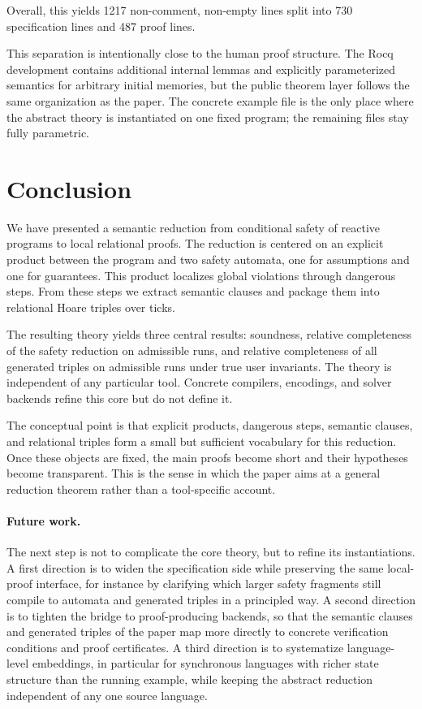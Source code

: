 \documentclass[acmsmall,screen]{acmart}
\theoremstyle{leftplain}
\theoremstyle{leftdefinition}
\theoremstyle{leftremark}
\begin{document}
Overall, this yields 1217 non-comment, non-empty lines split into 730
specification lines and 487 proof lines.

This separation is intentionally close to the human proof structure. The Rocq
development contains additional internal lemmas and explicitly parameterized
semantics for arbitrary initial memories, but the public theorem layer follows
the same organization as the paper. The concrete example file is the only place
where the abstract theory is instantiated on one fixed program; the remaining
files stay fully parametric.

\section{Conclusion}\label{sec:conclusion}
We have presented a semantic reduction from conditional safety of reactive
programs to local relational proofs. The reduction is centered on an explicit
product between the program and two safety automata, one for assumptions and
one for guarantees. This product localizes global violations through dangerous
steps. From these steps we extract semantic clauses and package them into
relational Hoare triples over ticks.

The resulting theory yields three central results: soundness, relative
completeness of the safety reduction on admissible runs, and relative
completeness of all generated triples on admissible runs under true user
invariants. The theory is independent of any particular tool. Concrete
compilers, encodings, and solver backends refine this core but do not define
it.

The conceptual point is that explicit products, dangerous steps, semantic
clauses, and relational triples form a small but sufficient vocabulary for this
reduction. Once these objects are fixed, the main proofs become short and their
hypotheses become transparent. This is the sense in which the paper aims at a
general reduction theorem rather than a tool-specific account.

\paragraph{Future work.}
The next step is not to complicate the core theory, but to refine its
instantiations. A first direction is to widen the specification side while
preserving the same local-proof interface, for instance by clarifying which
larger safety fragments still compile to automata and generated triples in a
principled way. A second direction is to tighten the bridge to proof-producing
backends, so that the semantic clauses and generated triples of the paper map
more directly to concrete verification conditions and proof certificates. A
third direction is to systematize language-level embeddings, in particular for
synchronous languages with richer state structure than the running example,
while keeping the abstract reduction independent of any one source language.



\end{document}
